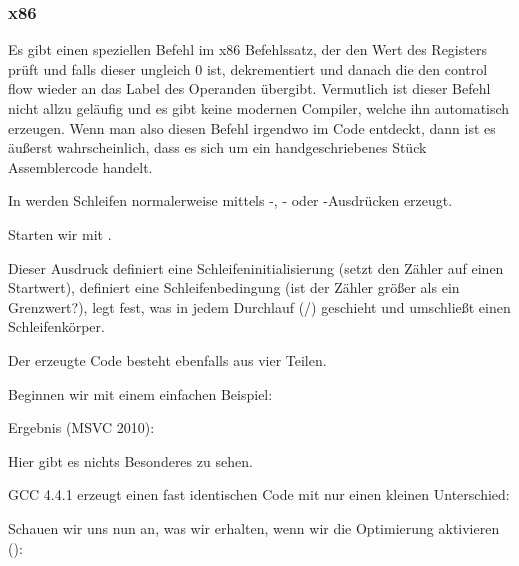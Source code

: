 \subsubsection{x86}

Es gibt einen speziellen \LOOP Befehl im x86 Befehlssatz, der den Wert des
Registers \ECX prüft und falls dieser ungleich 0 ist, dekrementiert und danach
die den control flow wieder an das Label des \LOOP Operanden übergibt.
Vermutlich ist dieser Befehl nicht allzu geläufig und es gibt keine modernen
Compiler, welche ihn automatisch erzeugen. Wenn man also diesen Befehl irgendwo
im Code entdeckt, dann ist es äußerst wahrscheinlich, dass es sich um ein
handgeschriebenes Stück Assemblercode handelt.

\par In \CCpp werden Schleifen normalerweise mittels -, - oder
-Ausdrücken erzeugt.

Starten wir mit .


Dieser Ausdruck definiert eine Schleifeninitialisierung (setzt den Zähler auf
einen Startwert), definiert eine Schleifenbedingung (ist der Zähler größer als
ein Grenzwert?), legt fest, was in jedem Durchlauf
(/) geschieht und umschließt einen
Schleifenkörper.



Der erzeugte Code besteht ebenfalls aus vier Teilen.

Beginnen wir mit einem einfachen Beispiel:



Ergebnis (MSVC 2010):



Hier gibt es nichts Besonderes zu sehen.

GCC 4.4.1 erzeugt einen fast identischen Code mit nur einen kleinen Unterschied:



Schauen wir uns nun an, was wir erhalten, wenn wir die Optimierung aktivieren
(\TT{\Ox}):



